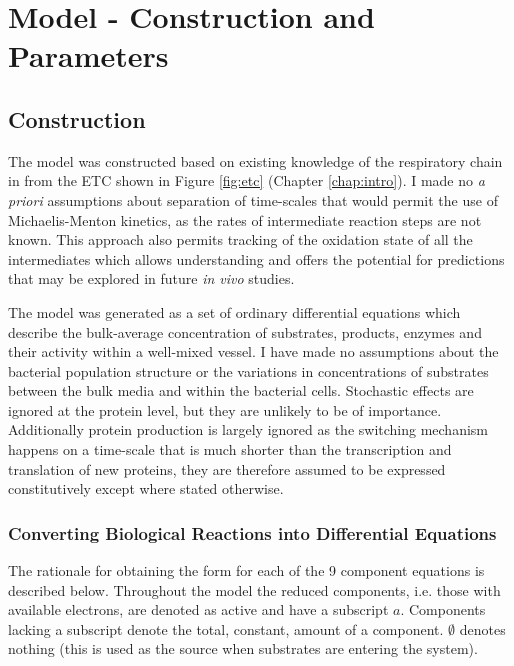 \chapter{Model - Construction and Parameters}
\label{chap:model}
\section{Construction}

The model was constructed based on existing knowledge of the respiratory chain in \Nsm{} from the ETC shown in Figure \ref{fig:etc} (Chapter \ref{chap:intro}). I made no \textit{a priori} assumptions about separation of time-scales that would permit the use of Michaelis-Menton kinetics, as the rates of intermediate reaction steps are not known. This approach also permits tracking of the oxidation state of all the intermediates which allows understanding and offers the potential for predictions that may be explored in future \textit{in vivo} studies.

The model was generated as a set of ordinary differential equations which describe the bulk-average concentration of substrates, products, enzymes and their activity within a well-mixed vessel. I have made no assumptions about the bacterial population structure or the variations in concentrations of substrates between the bulk media and within the bacterial cells. Stochastic effects are ignored at the protein level, but they are unlikely to be of importance. Additionally protein production is largely ignored as the switching mechanism happens on a time-scale that is much shorter than the transcription and translation of new proteins, they are therefore assumed to be expressed constitutively except where stated otherwise.

\subsection{Converting Biological Reactions into Differential Equations}
The rationale for obtaining the form for each of the 9 component equations is described below. Throughout the model the reduced components, i.e. those with available electrons, are denoted as active and have a subscript $a$. Components lacking a subscript denote the total, constant, amount of a component. $\emptyset$ denotes nothing (this is used as the source when substrates are entering the system).

